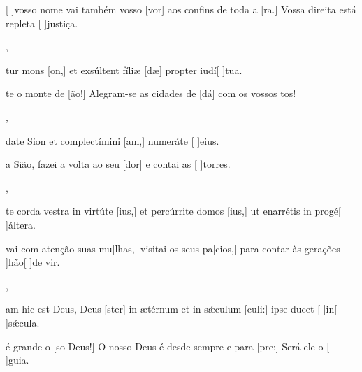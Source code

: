 {    {\item {}[ ]{vos}so nome vai também vosso [vor] aos confins de toda a [ra.] Vossa direita está repleta [ ]{jus}{ti}ça.~\Antiphona},
  {\item {}tur mons [on,] et exsúltent fíliæ [dæ] propter iudí[ ]{tu}a.~\Antiphona}%
    {\item {}te o monte de [ão!] Alegram-se as cida\-des de [dá] com os vossos tos!~\Antiphona},
  {\item {}date Sion et complectímini [am,] numeráte [ ]{e}ius.~\Antiphona}%
    {\item {} a Sião, fazei a volta ao seu [dor] e contai as [ ]{tor}res.~\Antiphona},
  {\item {}te corda vestra in virtúte [ius,] et percúrrite domos [ius,] ut enarrétis in progé[ ]{ál}tera.~\Antiphona}%
    {\item {}vai com atenção suas mu[lhas,] visitai os seus pa[cios,] para contar às gerações [ ]{hão}[ ]{de} vir.~\Antiphona},
  {\item {}am hic est Deus, Deus [ster] in ætérnum et in sǽculum [culi:] ipse ducet [ ]{in}[ ]{sǽ}cula.~\Antiphona}%
    {\item {} é grande o [so Deus!] O nosso Deus é desde sempre e para [pre:] Será ele o [ ]{gui}a.~\Antiphona}
}